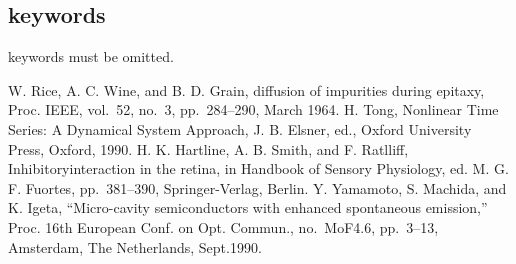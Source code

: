 \documentclass[MIRU,submit,english]{miru2019e}
\begin{document}
\subsection{keywords}

keywords must be omitted.

%

%
%

\begin{thebibliography}{9}%
W. Rice, A. C. Wine, and B. D. Grain,
diffusion of impurities during epitaxy,
Proc. IEEE, vol.~52, no.~3, pp.~284--290, March 1964.
 H. Tong, Nonlinear Time Series: A Dynamical System Approach, J. B. Elsner, ed., Oxford University Press, Oxford, 1990.
H. K. Hartline, A. B. Smith, and F. Ratlliff,
Inhibitoryinteraction in the retina,
in Handbook of Sensory Physiology,
ed. M. G. F. Fuortes, pp.~381--390, Springer-Verlag, Berlin.
Y. Yamamoto, S. Machida, and K. Igeta,
``Micro-cavity semiconductors with enhanced spontaneous emission,''
Proc. 16th European Conf. on Opt. Commun.,
no.~MoF4.6, pp.~3--13, Amsterdam, The Netherlands, Sept.1990.
\end{thebibliography}
\end{document}
